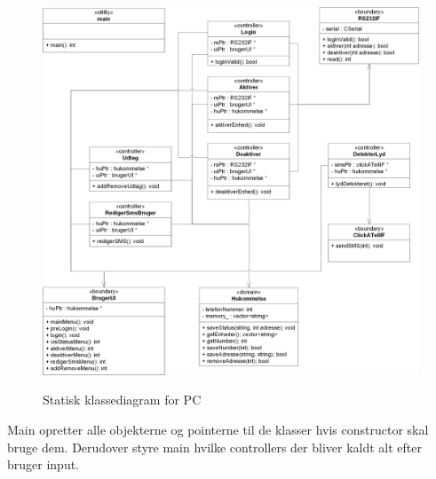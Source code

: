 \clearpage
\vspace*{30 px}
\begin{figure}[H]
     {\includegraphics[width=\textwidth]{billeder/uml/PC_Class_static}}
     \caption{Statisk klassediagram for PC}
     \label{fig:PC_Class_Static}
\end{figure}

Main opretter alle objekterne og pointerne til de klasser hvis constructor skal bruge dem. Derudover styre main hvilke controllers der bliver kaldt alt efter bruger input.
%
